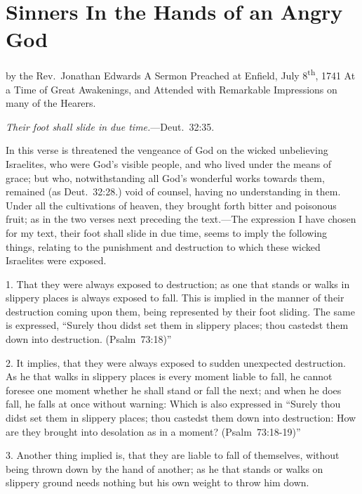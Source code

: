\documentclass[
]{book}
\begin{document}
\clearpage
\setcounter{page}{1}

\hypertarget{sinners-in-the-hands-of-an-angry-god}{%
\chapter{Sinners In the Hands of an Angry God}\label{sinners-in-the-hands-of-an-angry-god}}

by the Rev.~Jonathan Edwards A Sermon Preached at Enfield, July 8\textsuperscript{th}, 1741 At a Time of Great Awakenings, and Attended with Remarkable Impressions on many of the Hearers.

\emph{Their foot shall slide in due time.}---Deut.~32:35.

In this verse is threatened the vengeance of God on the wicked unbelieving Israelites, who were God's visible people, and who lived under the means of grace; but who, notwithstanding all God's wonderful works towards them, remained (as Deut.~32:28.) void of counsel, having no understanding in them. Under all the cultivations of heaven, they brought forth bitter and poisonous fruit; as in the two verses next preceding the text.---The expression I have chosen for my text, their foot shall slide in due time, seems to imply the following things, relating to the punishment and destruction to which these wicked Israelites were exposed.

1. That they were always exposed to destruction; as one that stands or walks in slippery places is always exposed to fall. This is implied in the manner of their destruction coming upon them, being represented by their foot sliding. The same is expressed, ``Surely thou didst set them in slippery places; thou castedst them down into destruction. (Psalm~73:18)''

2. It implies, that they were always exposed to sudden unexpected destruction. As he that walks in slippery places is every moment liable to fall, he cannot foresee one moment whether he shall stand or fall the next; and when he does fall, he falls at once without warning: Which is also expressed in ``Surely thou didst set them in slippery places; thou castedst them down into destruction: How are they brought into desolation as in a moment? (Psalm~73:18-19)''

3. Another thing implied is, that they are liable to fall of themselves, without being thrown down by the hand of another; as he that stands or walks on slippery ground needs nothing but his own weight to throw him down.
\end{document}
